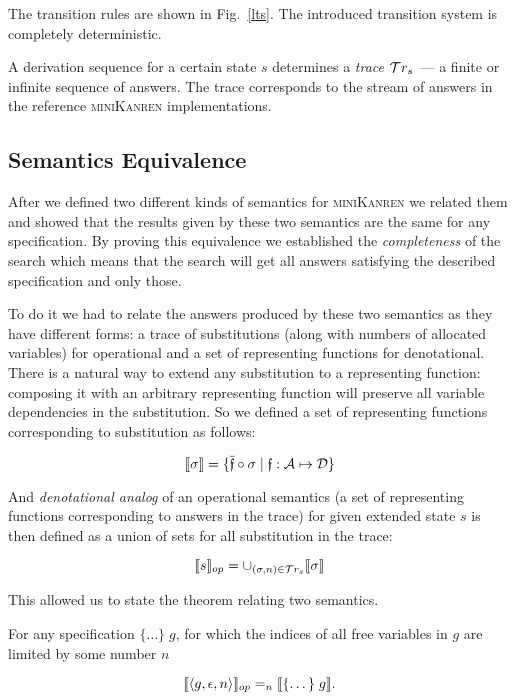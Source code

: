 The transition rules are shown in Fig.~\ref{lts}. The introduced transition system is completely deterministic.

A derivation sequence for a certain state $s$ determines a \emph{trace} $\mathcal{T}r_{s}$~--- a finite or infinite sequence of answers. The trace corresponds to the stream of answers
in the reference \textsc{miniKanren} implementations.

\subsection{Semantics Equivalence}

After we defined two different kinds of semantics for \textsc{miniKanren} we related them and showed that the results given by these two semantics are the same for any specification.
By proving this equivalence we established the \emph{completeness} of the search which means that the search will get all answers satisfying the described specification and only those.

To do it we had to relate the answers produced by these two semantics as they have different forms: a trace of substitutions (along with numbers of allocated variables)
for operational and a set of representing functions for denotational. There is a natural way to extend any substitution to a representing function: composing it with an arbitrary representing function will preserve all variable dependencies in the substitution. So we defined a set of representing functions corresponding to substitution as follows:

\[
\llbracket{\sigma}\rrbracket = \{\overline{\mathfrak f} \circ \sigma \mid \mathfrak{f}:\mathcal{A}\mapsto\mathcal{D}\}
\]

And \emph{denotational analog} of an operational semantics (a set of representing functions corresponding to answers in the trace) for given extended state $s$ is
then defined as a union of sets for all substitution in the trace:

\[
\llbracket{s}\rrbracket_{op} = \cup_{(\sigma, n) \in \mathcal{T}r_{s}} \llbracket{\sigma}\rrbracket
\]

This allowed us to state the theorem relating two semantics.

\begin{theorem}
For any specification $\{\dots\}\; g$, for which the indices of all free variables in $g$ are limited by some number $n$

\[
\llbracket{\left<{g, \epsilon, n}\right>}\rrbracket_{op} =_n \llbracket{\{\dots\}\; g}\rrbracket.
\]
\end{theorem}

